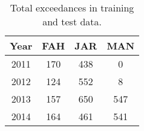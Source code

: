 \begin{table}[]
\centering
\caption{Total exceedances in training and test data.}
\label{tab:exceedances}
\begin{tabular}{@{}cccc@{}}
\toprule
\textbf{Year} & \textbf{FAH} & \textbf{JAR} & \textbf{MAN} \\ \midrule
2011 & 170 & 438 & 0 \\
2012 & 124 & 552 & 8 \\
2013 & 157 & 650 & 547 \\
2014 & 164 & 461 & 541 \\ \bottomrule
\end{tabular}
\end{table}